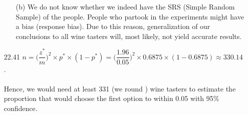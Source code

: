 \documentclass[11pt, a4paper]{article}
\newcommand\und[1]{\underline{\smash{#1}}}
\begin{document}
\begin{itemize}
\begin{itemize}
\item[]

\item[(b)]
We do not know whether we indeed have the SRS (Simple Random Sample) of the people.
People who partook in the experiments might have a bias (response bias). Due to this
reason, generalization of our conclusions to all wine tasters will, most likely, not
yield accurate results.
\end{itemize}

\item[]
\item[]


\item[22.41]
$n = \bigg(\dfrac{z^*}{m}\bigg)^2 \times p^* \times (1 - p^*) = \bigg(\dfrac{1.96}{0.05}\bigg)^2 \times 0.6875 \times (1 - 0.6875) \approx 330.14$.\\\\
Hence, we would need at least 331 (we round \und{up}) wine tasters to estimate the proportion that would choose the first option to within 0.05
with 95\% confidence.
\end{itemize}
\end{document}
